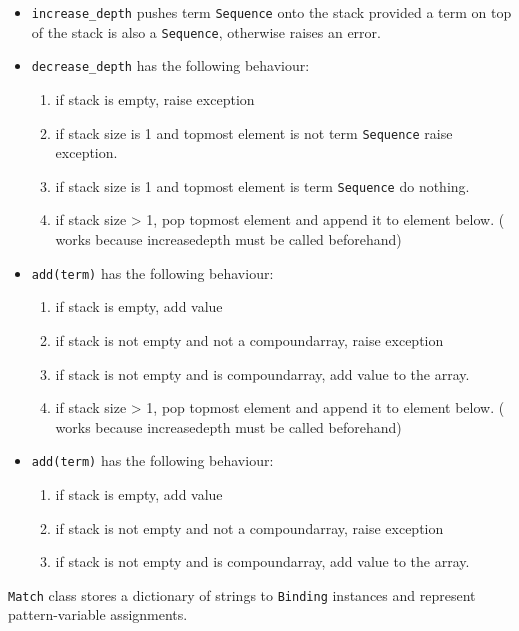 \begin{itemize}
\item 
\texttt{increase\_depth} pushes term \texttt{Sequence} onto the stack provided a term on top of the stack is also a \texttt{Sequence}, otherwise raises an error.

\item
\texttt{decrease\_depth} has the following behaviour:
	\begin{enumerate}
		\item
        if stack is empty, raise exception
		\item
		if stack size is 1 and topmost element is not term \texttt{Sequence} raise exception.
		\item
		if stack size is 1 and topmost element is term \texttt{Sequence} do nothing.
		\item
        if stack size > 1, pop topmost element and append it to element below. ( works because increasedepth must be called beforehand)
	\end{enumerate}

\item
\texttt{add(term)} has the following behaviour:
	\begin{enumerate}
		\item
         if stack is empty, add value
		\item
         if stack is not empty and not a compoundarray, raise exception
		\item
        if stack is not empty and is compoundarray, add value to the array.
		\item
        if stack size > 1, pop topmost element and append it to element below. ( works because increasedepth must be called beforehand)
	\end{enumerate}

\item
\texttt{add(term)} has the following behaviour:
	\begin{enumerate}
		\item
         if stack is empty, add value
		\item
         if stack is not empty and not a compoundarray, raise exception
		\item
        if stack is not empty and is compoundarray, add value to the array.
	\end{enumerate}
\end{itemize}



\texttt{Match} class stores a dictionary of strings to \texttt{Binding} instances and represent pattern-variable assignments. 

